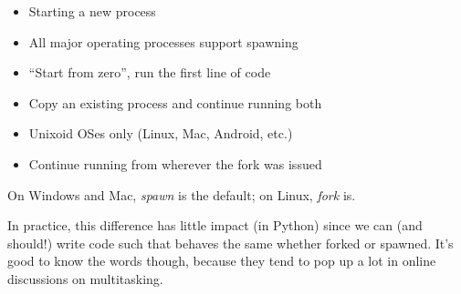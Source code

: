 \begin{frame}
%
\begin{tcbraster}[raster columns=2,
                  raster equal height,
                  nobeforeafter,
                  raster column skip=0.5cm]
\begin{defbox}[Spawning]
\small
\begin{itemize}
\item Starting a new process
\item All major operating processes support spawning
\item \enquote{Start from zero}, \ie run the first line of code
\end{itemize}
\end{defbox}
\begin{defbox}[Forking]
\small
\begin{itemize}
\item Copy an existing process and continue running both
\item Unixoid OSes only (Linux, Mac, Android, etc.)
\item Continue running from wherever the fork was issued
\end{itemize}
\end{defbox}
\end{tcbraster}
%
\begin{hintbox}
\small
On Windows and Mac, \emph{spawn} is the default; on Linux, \emph{fork} is.

\vspace{6pt}
In practice, this difference has little impact (in Python) since we can (and should!) write code such that behaves the same whether forked or spawned. It's good to know the words though, because they tend to pop up a lot in online discussions on multitasking.
\end{hintbox}
%
\end{frame}


